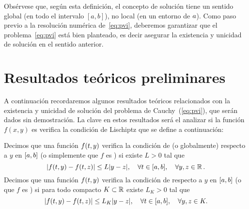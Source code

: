 Obsérvese que, según esta definición, el
concepto de solución tiene un sentido global (en todo el intervalo
$[a,b]$), no local (en un entorno de $\ta$).
Como paso previo a la resolución numérica de~\eqref{eq:pvi}, deberemos
garantizar que el problema~\eqref{eq:pvi} está bien planteado, es
decir asegurar la existencia y unicidad de solución en el sentido
anterior. 

\section{Resultados teóricos preliminares}
\label{sec:tema4:resultados-teoricos}

A continuación recordaremos algunos resultados teóricos relacionados
con la existencia y unicidad de solución del problema de
Cauchy~(\ref{eq:pvi}), que serán dados sin demostración. La clave en
estos resultados será el analizar si la función $f(x,y)$ es verifica
la condición de Lischiptz que se define a continuación:

\begin{definition}
  \label{def:lischiptz}
  Decimos que una función $f(\tt,y)$ verifica la condición de
   (o globalmente) respecto a $y$ en
    $[\ta,\tb]$ (o simplemente que $f$ es \lischiptz)
    si existe $L>0$ tal que
  \begin{equation*}
    |f(\tt,y) - f(\tt,z)| \le L |y-z|, \quad \forall \tt\in [\ta,\tb],
    \quad  \forall y,z\in \Rset.
  \end{equation*}
  Decimos que una función $f(\tt,y)$ verifica la condición de
   respecto a $y$ en
  $[\ta,\tb]$ (o que $f$ es \locLischiptz) si para todo compacto
  $K\subset\Rset$ existe $L_K>0$ tal que
  \begin{equation*}
    |f(\tt,y) - f(\tt,z)| \le L_K |y-z|, \quad \forall \tt\in [\ta,\tb],
    \quad  \forall y,z\in K.
  \end{equation*}
\end{definition}

